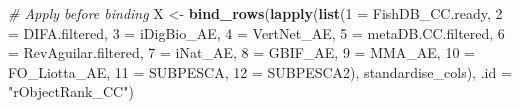 \documentclass[sn-apa,pdflatex]{sn-jnl}
\newenvironment{Shaded}{\begin{snugshade}}{\end{snugshade}}
\newcommand{\AttributeTok}[1]{\textcolor[rgb]{0.13,0.29,0.53}{#1}}
\newcommand{\CommentTok}[1]{\textcolor[rgb]{0.56,0.35,0.01}{\textit{#1}}}
\newcommand{\FunctionTok}[1]{\textcolor[rgb]{0.13,0.29,0.53}{\textbf{#1}}}
\newcommand{\NormalTok}[1]{#1}
\newcommand{\OtherTok}[1]{\textcolor[rgb]{0.56,0.35,0.01}{#1}}
\newcommand{\StringTok}[1]{\textcolor[rgb]{0.31,0.60,0.02}{#1}}
\begin{document}
\begin{Shaded}
\begin{Highlighting}[]
\CommentTok{\# Apply before binding}
\NormalTok{X }\OtherTok{\textless{}{-}} \FunctionTok{bind\_rows}\NormalTok{(}\FunctionTok{lapply}\NormalTok{(}\FunctionTok{list}\NormalTok{(}\StringTok{\textasciigrave{}}\AttributeTok{1}\StringTok{\textasciigrave{}} \OtherTok{=}\NormalTok{ FishDB\_CC.ready, }\StringTok{\textasciigrave{}}\AttributeTok{2}\StringTok{\textasciigrave{}} \OtherTok{=}\NormalTok{ DIFA.filtered,}
    \StringTok{\textasciigrave{}}\AttributeTok{3}\StringTok{\textasciigrave{}} \OtherTok{=}\NormalTok{ iDigBio\_AE, }\StringTok{\textasciigrave{}}\AttributeTok{4}\StringTok{\textasciigrave{}} \OtherTok{=}\NormalTok{ VertNet\_AE, }\StringTok{\textasciigrave{}}\AttributeTok{5}\StringTok{\textasciigrave{}} \OtherTok{=}\NormalTok{ metaDB.CC.filtered,}
    \StringTok{\textasciigrave{}}\AttributeTok{6}\StringTok{\textasciigrave{}} \OtherTok{=}\NormalTok{ RevAguilar.filtered, }\StringTok{\textasciigrave{}}\AttributeTok{7}\StringTok{\textasciigrave{}} \OtherTok{=}\NormalTok{ iNat\_AE, }\StringTok{\textasciigrave{}}\AttributeTok{8}\StringTok{\textasciigrave{}} \OtherTok{=}\NormalTok{ GBIF\_AE,}
    \StringTok{\textasciigrave{}}\AttributeTok{9}\StringTok{\textasciigrave{}} \OtherTok{=}\NormalTok{ MMA\_AE, }\StringTok{\textasciigrave{}}\AttributeTok{10}\StringTok{\textasciigrave{}} \OtherTok{=}\NormalTok{ FO\_Liotta\_AE, }\StringTok{\textasciigrave{}}\AttributeTok{11}\StringTok{\textasciigrave{}} \OtherTok{=}\NormalTok{ SUBPESCA, }\StringTok{\textasciigrave{}}\AttributeTok{12}\StringTok{\textasciigrave{}} \OtherTok{=}\NormalTok{ SUBPESCA2),}
\NormalTok{    standardise\_cols), }\AttributeTok{.id =} \StringTok{"rObjectRank\_CC"}\NormalTok{)}
\end{Highlighting}
\end{Shaded}

\begingroup\fontsize{8}{10}\selectfont
\end{document}
